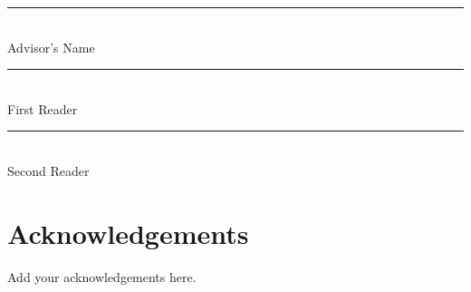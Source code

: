 \documentclass[12pt, oneside]{book2}
\begin{document}
\begin{titlepage}
\begin{center}
\vspace{1.5cm}

\rule[-0.1cm]{8cm}{0.01cm} \\
Advisor's Name \\
\vspace{1.0cm}
\rule[-0.1cm]{8cm}{0.01cm} \\
First Reader \\
\vspace{1.0cm}
\rule[-0.1cm]{8cm}{0.01cm} \\
Second Reader \\
\end{center}
\thispagestyle{empty}
\end{titlepage}

\singlespacing
\setcounter{page}{3}
\tableofcontents
\setcounter{tocdepth}{2}
\cleardoublepage
{}
\listoftables
\cleardoublepage
{}
\listoffigures

\newpage

\chapter{Acknowledgements}

\noindent Add your acknowledgements here.

\mainmatter










\appendix


\backmatter



\end{document}
